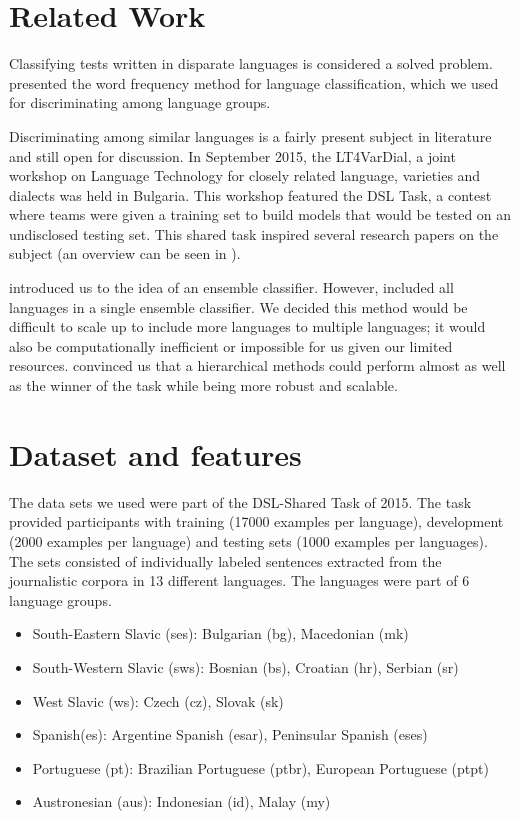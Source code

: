 \documentclass{article}
\begin{document}
\section{Related Work}

Classifying tests written in disparate languages is considered a solved problem. \cite{MacNee} presented the word frequency method for language classification, which we used for discriminating among language groups. 

Discriminating among similar languages is a fairly present subject in literature and still open for discussion. In September 2015, the LT4VarDial, a joint workshop on Language Technology for closely related language, varieties and dialects was held in Bulgaria. This workshop featured the DSL Task, a contest where teams were given a training set to build models that would be tested on an undisclosed testing set. This shared task inspired several research papers on the subject (an overview can be seen in \cite{dsl-overview}).

\cite{dsl-winner} introduced us to the idea of an ensemble classifier. However, \cite{dsl-winner} included all languages in a single ensemble classifier. We decided this method would be difficult to scale up to include more languages to multiple languages; it would also be computationally inefficient or impossible for us given our limited resources. \cite{two-steps} convinced us that a hierarchical methods could perform almost as well as the winner of the task while being more robust and scalable.

\section{Dataset and features}

The data sets we used were part of the DSL-Shared Task of 2015. The task provided participants with training (17000 examples per language), development (2000 examples per language) and testing sets (1000 examples per languages). The sets consisted of individually labeled sentences extracted from the journalistic corpora in 13 different languages. The languages were part of 6 language groups.
\begin{itemize}
\item South-Eastern Slavic (ses): Bulgarian (bg), Macedonian (mk)
\item South-Western Slavic (sws): Bosnian (bs), Croatian (hr), Serbian (sr)
\item West Slavic (ws): Czech (cz), Slovak (sk)
\item Spanish(es): Argentine Spanish (esar), Peninsular Spanish (eses)
\item Portuguese (pt): Brazilian Portuguese (ptbr), European Portuguese (ptpt)
\item Austronesian (aus): Indonesian (id), Malay (my)
\end{itemize}
\end{document}
